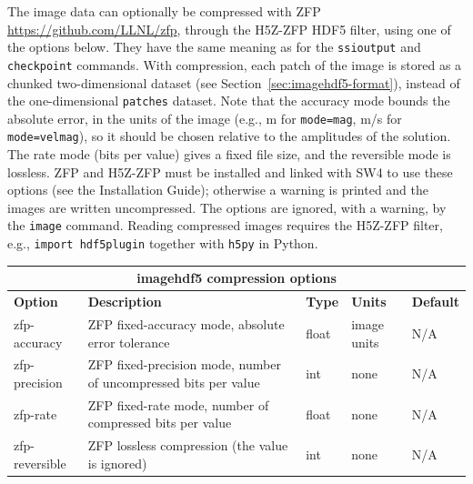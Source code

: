 \documentclass[11pt]{report}
\begin{document}
{The image data can optionally be compressed with ZFP \url{https://github.com/LLNL/zfp}, through the
H5Z-ZFP HDF5 filter, using one of the options below. They have the same meaning as for the
\verb+ssioutput+ and \verb+checkpoint+ commands. With compression, each patch of the image is
stored as a chunked two-dimensional dataset (see Section~\ref{sec:imagehdf5-format}), instead of
the one-dimensional {\tt patches} dataset. Note that the accuracy mode bounds the absolute error,
in the units of the image (e.g., m for {\tt mode=mag}, m/s for {\tt mode=velmag}), so it should be
chosen relative to the amplitudes of the solution. The rate mode (bits per value) gives a fixed
file size, and the reversible mode is lossless. ZFP and H5Z-ZFP must be installed and linked with
SW4 to use these options (see the Installation Guide); otherwise a warning is printed and the
images are written uncompressed. The options are ignored, with a warning, by the {\tt image}
command. Reading compressed images requires the H5Z-ZFP filter, e.g., \verb+import hdf5plugin+
together with {\tt h5py} in Python.
\begin{center}
\begin{tabular}{|l|p{8cm}|l|l|l|} \hline
\multicolumn{5}{|c|}{\bf imagehdf5 compression options}\\ \hline
{\bf Option} & {\bf Description}          & {\bf Type} & {\bf Units} & {\bf Default} \\ \hline
\hline
zfp-accuracy & ZFP fixed-accuracy mode, absolute error tolerance & float & image units & N/A \\ \hline
zfp-precision & ZFP fixed-precision mode, number of uncompressed bits per value & int & none & N/A \\ \hline
zfp-rate & ZFP fixed-rate mode, number of compressed bits per value & float & none & N/A \\ \hline
zfp-reversible & ZFP lossless compression (the value is ignored) & int & none & N/A \\ \hline
\end{tabular}
\end{center}


}
\end{document}
